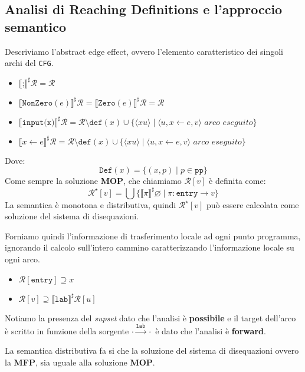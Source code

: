 \subsection{Analisi di Reaching Definitions e l'approccio semantico}
Descriviamo l'abstract edge effect, ovvero l'elemento caratteristico dei singoli archi del \texttt{CFG}.
\begin{itemize}
    \item $\llbracket\texttt{;} \rrbracket^\sharp \mathcal{R} = \mathcal{R}$
    \item $\llbracket \texttt{NonZero}(e) \rrbracket^\sharp \mathcal{R} = 
    \llbracket \texttt{Zero}(e) \rrbracket^\sharp \mathcal{R}
    = \mathcal{R}$
    \item $\llbracket \texttt{input(x)} \rrbracket^\sharp \mathcal{R} =
        \mathcal{R} \setminus \texttt{def}(x) \cup \{\langle xu \rangle \mid 
        \langle u, x \gets e, v \rangle \textit{ arco eseguito}\}$
    \item $\llbracket x \gets e \rrbracket^\sharp \mathcal{R} = 
        \mathcal{R} \setminus \texttt{def}(x) \cup \{\langle xu \rangle \mid 
        \langle u, x \gets e, v \rangle \textit{ arco eseguito}\}$
\end{itemize}
Dove:
\[
    \texttt{Def}(x) = \{(x,p) \mid p \in \texttt{pp}\}
\]
Come sempre la soluzione \textbf{MOP}, che chiamiamo $\mathcal{R}[v]$ è definita come:
\[
    \mathcal{R}^\star[v] = \bigcup \{ \llbracket \pi \rrbracket^\sharp \varnothing
    \mid \pi : \texttt{entry} \to v \}
\]
La semantica è monotona e distributiva, quindi $\mathcal{R}^\star [v]$ può essere calcolata come 
soluzione del sistema di disequazioni.

Forniamo quindi l'informazione di trasferimento locale ad ogni punto programma, ignorando il calcolo 
sull'intero cammino caratterizzando l'informazione locale su ogni arco.

\begin{itemize}
    \item $\mathcal{R}[\texttt{entry}] \supseteq x$ 
    \item $\mathcal{R}[v] \supseteq \llbracket \texttt{lab}\rrbracket^\sharp \mathcal{R}[u]$
\end{itemize}
Notiamo la presenza del \textit{supset} dato che l'analisi è \textbf{possibile} e il target 
dell'arco è scritto in funzione della sorgente $\cdot \stackrel{\texttt{lab}}{\longrightarrow} \cdot$ è dato 
che l'analisi è \textbf{forward}.

La  semantica distributiva fa si che la soluzione del sistema di disequazioni ovvero la 
\textbf{MFP}, sia uguale alla soluzione \textbf{MOP}. 

